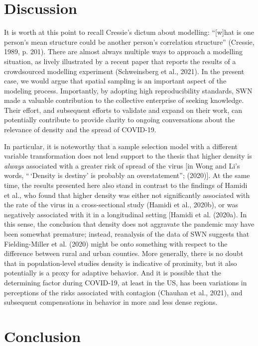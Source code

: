 \documentclass[]{elsarticle} %
\begin{document}
\hypertarget{discussion}{%
\section{Discussion}\label{discussion}}

It is worth at this point to recall Cressie's dictum about modelling:
``{[}w{]}hat is one person's mean structure could be another person's
correlation structure'' (Cressie, 1989, p. 201). There are almost always
multiple ways to approach a modelling situation, as lively illustrated
by a recent paper that reports the results of a crowdsourced modelling
experiment (Schweinsberg et al., 2021). In the present case, we would
argue that spatial sampling is an important aspect of the modeling
process. Importantly, by adopting high reproducibility standards, SWN
made a valuable contribution to the collective enterprise of seeking
knowledge. Their effort, and subsequent efforts to validate and expand
on their work, can potentially contribute to provide clarity to ongoing
conversations about the relevance of density and the spread of COVID-19.

In particular, it is noteworthy that a sample selection model with a
different variable transformation does not lend support to the thesis
that higher density is \emph{always} associated with a greater risk of
spread of the virus {[}in Wong and Li's words, ``\,`Density is destiny'
is probably an overstatement''; (2020){]}. At the same time, the results
presented here also stand in contrast to the findings of Hamidi et al.,
who found that higher density was either not significantly associated
with the rate of the virus in a cross-sectional study (Hamidi et al.,
2020b), or was negatively associated with it in a longitudinal setting
{[}Hamidi et al. (2020a). In this sense, the conclusion that density
does not aggravate the pandemic may have been somewhat premature;
instead, reanalysis of the data of SWN suggests that Fielding-Miller et
al. (2020) might be onto something with respect to the difference
between rural and urban counties. More generally, there is no doubt that
in population-level studies density is indicative of proximity, but it
also potentially is a proxy for adaptive behavior. And it is possible
that the determining factor during COVID-19, at least in the US, has
been variations in perceptions of the risks associated with contagion
(Chauhan et al., 2021), and subsequent compensations in behavior in more
and less dense regions.

\hypertarget{conclusion}{%
\section{Conclusion}\label{conclusion}}
\end{document}
